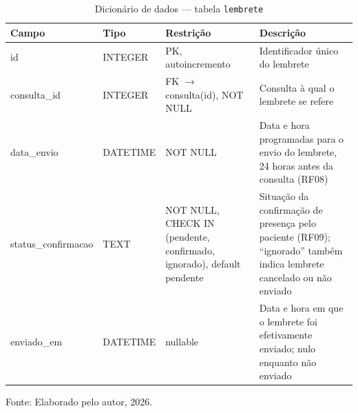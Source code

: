 \documentclass[12pt,a4paper]{extarticle}
\begin{document}
\begin{table}[H]
    \centering
    \caption{Dicionário de dados --- tabela \texttt{lembrete}}
    {\small
    \begin{tabularx}{\textwidth}{@{}L{3.3cm} L{1.8cm} L{4.0cm} Y@{}}
        \toprule
        \textbf{Campo} & \textbf{Tipo} & \textbf{Restrição} & \textbf{Descrição} \\
        \midrule
        id & INTEGER & PK, autoincremento & Identificador único do lembrete \\
        consulta\_\allowbreak{}id & INTEGER & FK $\rightarrow$ consulta(id), NOT NULL & Consulta à qual o lembrete se refere \\
        data\_\allowbreak{}envio & DATETIME & NOT NULL & Data e hora programadas para o envio do lembrete, 24 horas antes da consulta (RF08) \\
        status\_\allowbreak{}confirmacao & TEXT & NOT NULL, CHECK IN (pendente, confirmado, ignorado), default pendente & Situação da confirmação de presença pelo paciente (RF09); ``ignorado'' também indica lembrete cancelado ou não enviado \\
        enviado\_\allowbreak{}em & DATETIME & nullable & Data e hora em que o lembrete foi efetivamente enviado; nulo enquanto não enviado \\
        \bottomrule
    \end{tabularx}
    }
    \vspace{0.12cm}
    {\raggedright\footnotesize Fonte: Elaborado pelo autor, 2026.\par}
\end{table}
\end{document}
